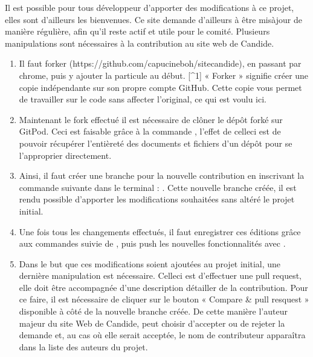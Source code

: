 \documentclass[a4,10pt,french]{sphinxmanual}
\begin{document}
\sphinxAtStartPar
Il est possible pour tous développeur d’apporter des modifications à ce projet, elles sont d’ailleurs les bienvenues. Ce site demande d’ailleurs à être mis\sphinxhyphen{}à\sphinxhyphen{}jour de manière régulière, afin qu’il reste actif et utile pour le comité. Plusieurs manipulations sont nécessaires à la contribution au site web de Candide.
\begin{enumerate}
%
\item {} 
\sphinxAtStartPar
Il faut forker  (https://github.com/capucineboh/site\sphinxhyphen{}candide), en passant par chrome, puis y ajouter la particule  au début.   {[}\textasciicircum{}1{]}
« Forker » signifie créer une copie indépendante sur son propre compte GitHub. Cette copie vous permet de travailler sur le code sans affecter l’original, ce qui est voulu ici.

\item {} 
\sphinxAtStartPar
Maintenant le fork effectué il est nécessaire de clôner le dépôt forké sur GitPod. Ceci est faisable grâce à la commande , l’effet de celle\sphinxhyphen{}ci est de pouvoir récupérer l’entièreté des documents et fichiers d’un dépôt pour se l’approprier directement.

\item {} 
\sphinxAtStartPar
Ainsi, il faut créer une branche pour la nouvelle contribution en inscrivant la commande suivante dans le terminal : . Cette nouvelle branche créée, il est rendu possible d’apporter les modifications souhaitées sans altéré le projet initial.

\item {} 
\sphinxAtStartPar
Une fois tous les changements effectués, il faut enregistrer ces éditions grâce aux commandes  suivie de , puis push les nouvelles fonctionnalités avec .

\item {} 
\sphinxAtStartPar
Dans le but que ces modifications soient ajoutées au projet initial, une dernière manipulation est nécessaire. Celle\sphinxhyphen{}ci est d’effectuer une pull request, elle doit être accompagnée d’une description détailler de la contribution. Pour ce faire, il est nécessaire de cliquer sur le bouton « Compare \& pull resquest » disponible à côté de la nouvelle branche créée. De cette manière l’auteur majeur du site Web de Candide, peut choisir d’accepter ou de rejeter la demande et, au cas où elle serait acceptée, le nom de contributeur apparaîtra dans la liste des auteurs du projet.

\end{enumerate}
\end{document}
